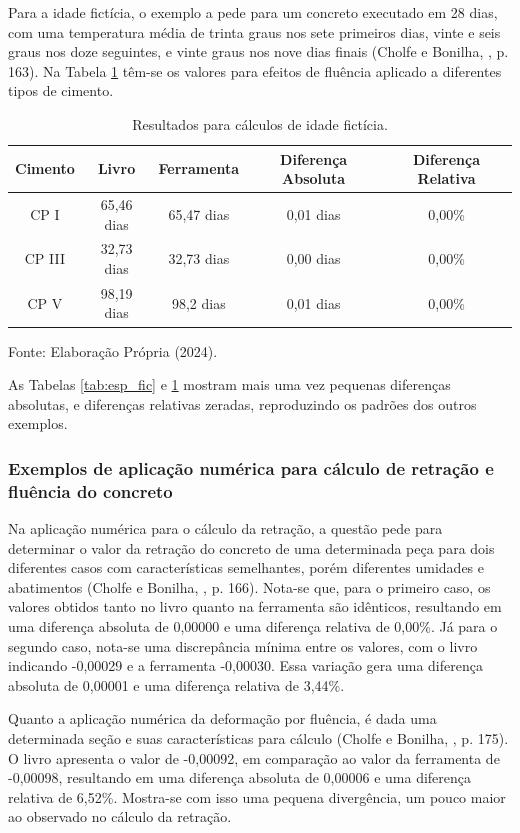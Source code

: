 Para a idade fictícia, o exemplo a pede para um concreto executado em 28 dias, com uma temperatura média de trinta graus nos sete primeiros dias, vinte e seis graus nos doze seguintes, e vinte graus nos nove dias finais (Cholfe e Bonilha, \citeyear{CB}, p. 163). Na Tabela \ref{tab:ida_fic} têm-se os valores para efeitos de fluência aplicado a diferentes tipos de cimento.

\begin{table}[h!]
\centering
\begin{tabular}{ccccc}
\hline
Cimento & Livro & Ferramenta & Diferença Absoluta & Diferença Relativa \\ \hline
CP I & 65,46 dias & 65,47 dias & 0,01 dias & 0,00\% \\
CP III & 32,73 dias & 32,73 dias & 0,00 dias & 0,00\% \\
CP V & 98,19 dias & 98,2 dias & 0,01 dias & 0,00\% \\ \hline
\end{tabular}
\caption{\label{tab:ida_fic} Resultados para cálculos de idade fictícia.}Fonte: Elaboração Própria (2024).
\end{table}

As Tabelas \ref{tab:esp_fic} e \ref{tab:ida_fic} mostram mais uma vez pequenas diferenças absolutas, e diferenças relativas zeradas, reproduzindo os padrões dos outros exemplos.

\subsubsection{Exemplos de aplicação numérica para cálculo de retração e fluência do concreto}

\hspace{0.4cm}Na aplicação numérica para o cálculo da retração, a questão pede para determinar o valor da retração do concreto de uma determinada peça para dois diferentes casos com características semelhantes, porém diferentes umidades e abatimentos (Cholfe e Bonilha, \citeyear{CB}, p. 166). Nota-se que, para o primeiro caso, os valores obtidos tanto no livro quanto na ferramenta são idênticos, resultando em uma diferença absoluta de 0,00000 e uma diferença relativa de 0,00\%. Já para o segundo caso, nota-se uma discrepância mínima entre os valores, com o livro indicando -0,00029 e a ferramenta -0,00030. Essa variação gera uma diferença absoluta de 0,00001 e uma diferença relativa de 3,44\%.

Quanto a aplicação numérica da deformação por fluência, é dada uma determinada seção e suas características para cálculo (Cholfe e Bonilha, \citeyear{CB}, p. 175). O livro apresenta o valor de -0,00092, em comparação ao valor da ferramenta de -0,00098, resultando em uma diferença absoluta de 0,00006 e uma diferença relativa de 6,52\%. Mostra-se com isso uma pequena divergência, um pouco maior ao observado no cálculo da retração.

